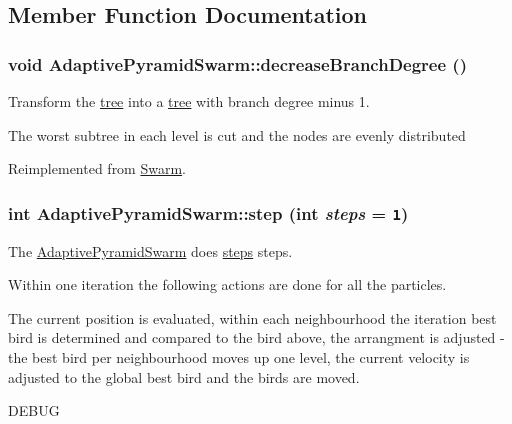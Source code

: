 \subsection{Member Function Documentation}
\hypertarget{classAdaptivePyramidSwarm_1882a87c019b03a0e39cde841f598aaf}{
\subsubsection{\setlength{\rightskip}{0pt plus 5cm}void AdaptivePyramidSwarm::decreaseBranchDegree ()}}
\label{classAdaptivePyramidSwarm_1882a87c019b03a0e39cde841f598aaf}


Transform the \hyperlink{classtree}{tree} into a \hyperlink{classtree}{tree} with branch degree minus 1. 

The worst subtree in each level is cut and the nodes are evenly distributed 

Reimplemented from \hyperlink{classSwarm_be7aff8e0df635ac00082fd6cd418356}{Swarm}.\hypertarget{classAdaptivePyramidSwarm_0d2d0278504ad096f288d8efe5dbf360}{
\subsubsection{\setlength{\rightskip}{0pt plus 5cm}int AdaptivePyramidSwarm::step (int {\em steps} = {\tt 1})}}
\label{classAdaptivePyramidSwarm_0d2d0278504ad096f288d8efe5dbf360}


The \hyperlink{classAdaptivePyramidSwarm}{AdaptivePyramidSwarm} does \hyperlink{runpso_8cpp_b4ae7205573977222eadd0795db193e2}{steps} steps. 

Within one iteration the following actions are done for all the particles.\par
 The current position is evaluated, within each neighbourhood the iteration best bird is determined and compared to the bird above, the arrangment is adjusted - the best bird per neighbourhood moves up one level, the current velocity is adjusted to the global best bird and the birds are moved. 

DEBUG 

